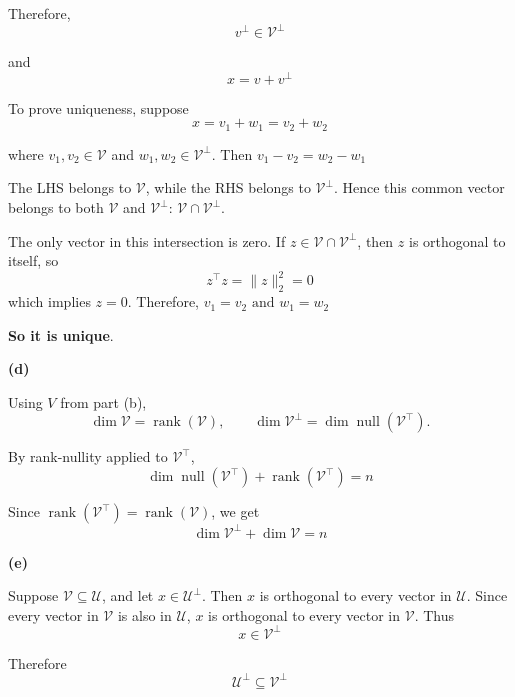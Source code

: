 Therefore,
\[
    v^\perp\in \mathcal{V}^\perp
\]

and
\[
    x=v+v^\perp
\]

To prove uniqueness, suppose
\[
    x=v_1+w_1=v_2+w_2
\]

where \(v_1,v_2\in \mathcal{V}\) and \(w_1,w_2\in \mathcal{V}^\perp\). Then
\(
    v_1-v_2=w_2-w_1
\)
\newline

The LHS belongs to \(\mathcal{V}\), while the RHS belongs to \(\mathcal{V}^\perp\). Hence this common vector belongs to
both $\mathcal{V}$ and $\mathcal{V}^\perp$: \(\mathcal{V}\cap \mathcal{V}^\perp\).
\newline

The only vector in this intersection is zero. If
\(z\in \mathcal{V}\cap \mathcal{V}^\perp\), then \(z\) is orthogonal to itself, so
\[
    z^\top z=\|z\|_2^2=0
\]
which implies \(z=0\). Therefore,
\(
    v_1=v_2
    \text{ and }
    w_1=w_2
\)

\textbf{So it is unique}.

\textbf{(d)}

Using \(V\) from part (b),
\[
    \dim \mathcal{V}=\operatorname{rank}(\mathcal{V}),
    \qquad
    \dim \mathcal{V}^\perp=\dim\operatorname{null}(\mathcal{V}^{\top}).
\]

By rank-nullity applied to \(\mathcal{V}^{\top}\),
\[
    \dim\operatorname{null}(\mathcal{V}^{\top})
    +
    \operatorname{rank}(\mathcal{V}^{\top})
    =
    n
\]

Since \(\operatorname{rank}(\mathcal{V}^{\top})=\operatorname{rank}(\mathcal{V})\),
we get
\[
    \dim \mathcal{V}^\perp+\dim \mathcal{V}=n
\]

\textbf{(e)}

Suppose \(\mathcal{V}\subseteq \mathcal{U}\), and let \(x\in \mathcal{U}^\perp\). Then \(x\) is
orthogonal to every vector in \(\mathcal{U}\). Since every vector in \(\mathcal{V}\) is also
in \(\mathcal{U}\), \(x\) is orthogonal to every vector in \(\mathcal{V}\). Thus
\[
    x\in \mathcal{V}^\perp
\]

Therefore
\[
    \mathcal{U}^\perp\subseteq \mathcal{V}^\perp
\]
